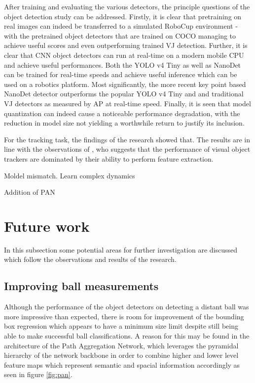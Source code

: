\documentclass[a4paper,twoside,12pt]{report}
\begin{document}
After training and evaluating the various detectors, the principle questions of the object detection study can be addressed. Firstly, it is clear that pretraining on real images can indeed be transferred to a simulated RoboCup environment - with the pretrained object detectors that are trained on COCO managing to achieve useful scores and even outperforming trained VJ detection. Further, it is clear that CNN object detectors can run at real-time on a modern mobile CPU and achieve useful performances. Both the YOLO v4 Tiny as well as NanoDet can be trained for real-time speeds and achieve useful inference which can be used on a robotics platform. Most significantly, the more recent key point based NanoDet detector outperforms the popular YOLO v4 Tiny and and traditional VJ detectors as measured by AP at real-time speed. Finally, it is seen that model quantization can indeed cause a noticeable performance degradation, with the reduction in model size not yielding a worthwhile return to justify its inclusion. 

For the tracking task, the findings of the research showed that. The results are in line with the observations of \cite{diagnosingtrack}, who suggests that the performance of visual object trackers are dominated by their ability to perform feature extraction.

Moldel mismatch. Learn complex dynamics

Addition of PAN

\section{Future work}

In this subsection some potential areas for further investigation are discussed which follow the observations and results of the research. 

\subsection{Improving ball measurements}

Although the performance of the object detectors on detecting a distant ball was more impressive than expected, there is room for improvement of the bounding box regression which appears to have a minimum size limit despite still being able to make successful ball classifications. A reason for this may be found in the architecture of the Path Aggregation Network, which leverages the pyramidal hierarchy of the network backbone in order to combine higher and lower level feature maps which represent semantic and spacial information accordingly as seen in figure \ref{fig:pan}. 
\end{document}

